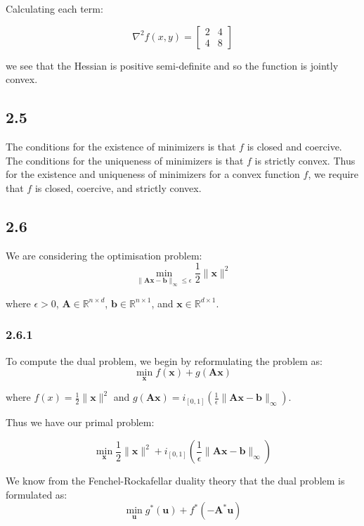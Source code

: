 \documentclass[12pt]{article}
\begin{document}
Calculating each term:

\[\nabla^2 f(x, y) = \begin{bmatrix}
                 2 & 4\\
                 4 & 8
         \end{bmatrix}
\]

we see that the Hessian is positive semi-definite and so the function is jointly convex.

\subsection*{2.5}
  The conditions for the existence of minimizers is that $f$ is closed and coercive.
  The conditions for the uniqueness of minimizers is that $f$ is strictly convex.
Thus for the existence and uniqueness of minimizers for a convex function $f$, we require that $f$ is closed, coercive, and strictly convex.

\subsection*{2.6}

We are considering the optimisation problem:
\[\min_{\|\textbf{A}\textbf{x} - \textbf{b}\|_{\infty} \leq \epsilon} \frac{1}{2}\|\textbf{x}\|^2\]

where $\epsilon > 0$, $\textbf{A} \in \mathbb{R}^{n\times d}$, $\textbf{b} \in \mathbb{R}^{n \times 1}$, and $\textbf{x} \in \mathbb{R}^{d \times 1}$.

\subsubsection*{2.6.1}

To compute the dual problem, we begin by reformulating the problem as:
\[\min_{\textbf{x}}  f(\textbf{x}) + g(\textbf{Ax})\]

where $f(x) = \frac{1}{2}\|\textbf{x}\|^2$ and $g(\textbf{Ax}) =  i_{[0, 1]}\left(\frac{1}{\epsilon}\|\textbf{A}\textbf{x} - \textbf{b}\|_{\infty}\right)$.

Thus we have our primal problem:

\[\min_{\textbf{x}}  \frac{1}{2}\|\textbf{x}\|^2 + i_{[0, 1]}\left(\frac{1}{\epsilon}\|\textbf{A}\textbf{x} - \textbf{b}\|_{\infty}\right)\]


We know from the Fenchel-Rockafellar duality theory that the dual problem is formulated as:
\[\min_{\textbf{u}}  g^*(\textbf{u}) + f^*(-\textbf{A}^*\textbf{u})\]
\end{document}
